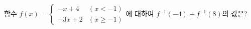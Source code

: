 함수 $f(x)=\begin{cases} -x+4 & (x<-1) \\ -3x+2 & (x\ge -1) \end{cases}$에 대하여 $f^{-1}(-4)+f^{-1}(8)$의 값은?
